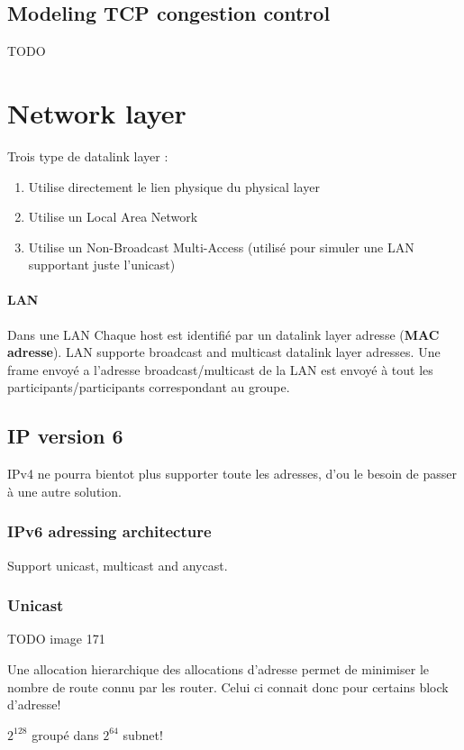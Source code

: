 \documentclass{report}
\begin{document}
\subsection{Modeling TCP congestion control}
TODO

\section{Network layer}
Trois type de datalink layer :
\begin{enumerate}
    \item Utilise directement le lien physique du physical layer
    \item Utilise un Local Area Network
    \item Utilise un Non-Broadcast Multi-Access (utilisé pour simuler une LAN supportant
        juste l'unicast)
\end{enumerate}

\paragraph{LAN} Dans une LAN Chaque host est identifié par un datalink layer adresse
(\textbf{MAC adresse}). 
LAN supporte broadcast and multicast datalink layer adresses. Une frame envoyé a l'adresse
broadcast/multicast de la LAN est envoyé à tout les participants/participants correspondant
au groupe.

\subsection{IP version 6}
IPv4 ne pourra bientot plus supporter toute les adresses, d'ou le besoin
de passer à une autre solution.

\subsubsection{IPv6 adressing architecture}
Support unicast, multicast and anycast.

\subsubsection{Unicast}
TODO image 171

Une allocation hierarchique des allocations d'adresse permet de minimiser
le nombre de route connu par les router. Celui ci connait donc pour
certains block d'adresse!

$2^{128}$ groupé dans $2^{64}$ subnet!
\end{document}
